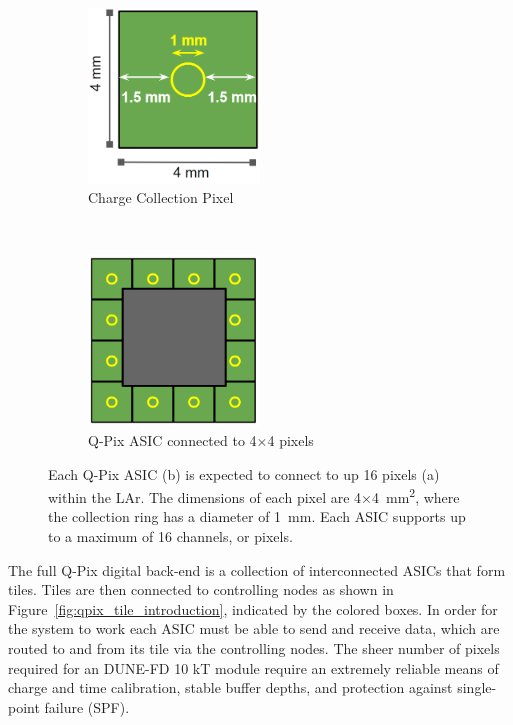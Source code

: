 \begin{figure}[t!]
\centering
\begin{subfigure}[t]{.5\textwidth}
  \centering
  \includegraphics[width=0.5\textwidth]{images/single_pixel_dimensions_qpix.png}
  \caption{Charge Collection Pixel}
\end{subfigure}%
~
\begin{subfigure}[t]{.5\textwidth}
  \centering
  \includegraphics[width=0.5\textwidth]{images/single_asic_dimensions_qpix.png}
  \caption{Q-Pix ASIC connected to 4$\times$4 pixels}
\end{subfigure}
\caption{Each Q-Pix ASIC (b) is expected to connect to up 16 pixels (a) within the LAr.
The dimensions of each pixel are 4$\times$4~\unit{mm^2}, where the collection ring has a diameter of 1~\unit{mm}.
Each ASIC supports up to a maximum of 16 channels, or pixels.
}
\label{fig:qpix_asic_introduction}
\end{figure}

The full Q-Pix digital back-end is a collection of interconnected ASICs that form tiles.
Tiles are then connected to controlling nodes as shown in Figure~\ref{fig:qpix_tile_introduction}, indicated by the colored boxes.
In order for the system to work each ASIC must be able to send and receive data, which are routed to and from its tile via the controlling nodes.
The sheer number of pixels required for an DUNE-FD 10 kT module require an extremely reliable means of charge and time calibration, stable buffer depths, and protection against single-point failure (SPF).

